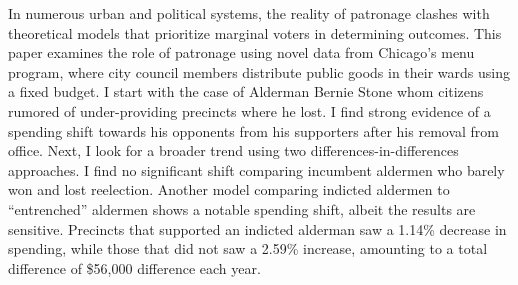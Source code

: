 \begin{spacing}{1.0}
    In numerous urban and political systems, the reality of patronage clashes with theoretical models that prioritize marginal voters in determining outcomes.
    This paper examines the role of patronage using novel data from Chicago's menu program, where city council members distribute public goods in their wards using a fixed budget.
    I start with the case of Alderman Bernie Stone whom citizens rumored of under-providing precincts where he lost.
    I find strong evidence of a spending shift towards his opponents from his supporters after his removal from office.
    Next, I look for a broader trend using two differences-in-differences approaches.
    I find no significant shift comparing incumbent aldermen who barely won and lost reelection.
    Another model comparing indicted aldermen to ``entrenched'' aldermen shows a notable spending shift, albeit the results are sensitive. 
    Precincts that supported an indicted alderman saw a 1.14\% decrease in spending, while those that did not saw a 2.59\% increase, amounting to a total difference of \$56,000 difference each year. 
\end{spacing}